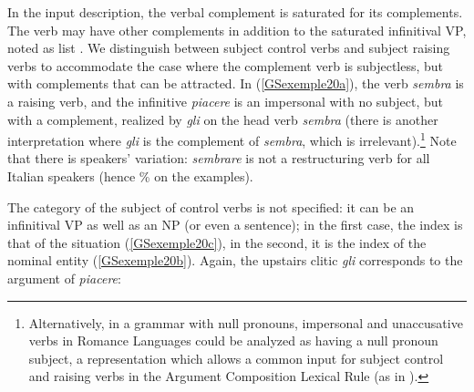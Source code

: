 \documentclass[output=paper]{langsci/langscibook}
\begin{document}
{In the input description, the verbal complement is saturated for its complements. The verb may have other complements in addition to the saturated infinitival VP, noted as list . We distinguish between subject control verbs and subject raising verbs to accommodate the case where the complement verb is subjectless, but with complements that can be attracted. In (\ref{GSexemple20a}), the verb \textit{sembra} is a raising verb, and the infinitive \textit{piacere} is an impersonal with no subject, but with a complement, realized by \textit{gli} on the head verb \textit{sembra} (there is another interpretation where \textit{gli} is the complement of \textit{sembra}, which is irrelevant).\footnote{Alternatively, in a grammar with null pronouns, impersonal and unaccusative verbs in Romance Languages could be analyzed as having a null pronoun subject, a representation which allows a common input for subject control and raising verbs in the Argument Composition Lexical Rule (as in \citealt{Monachesi98a}).} Note that there is speakers' variation: \textit{sembrare} is not a restructuring verb for all Italian speakers (hence \% on the examples).   

The category of the subject of control verbs is not specified: it can be an infinitival VP as well as an NP (or even a sentence); in the first case, the index is that of the situation (\ref{GSexemple20c}), in the second, it is the index of the nominal entity (\ref{GSexemple20b}). Again, the upstairs clitic \textit{gli} corresponds to the argument of \textit{piacere}:

\begin{exe}
	\ex \label{GSexemple20} 
	\begin{xlist}
        \label{GSexemple20a}

		\label{GSexemple20b}		
		
		\label{GSexemple20c}	
	\end{xlist}
\end{exe}

}
\end{document}
